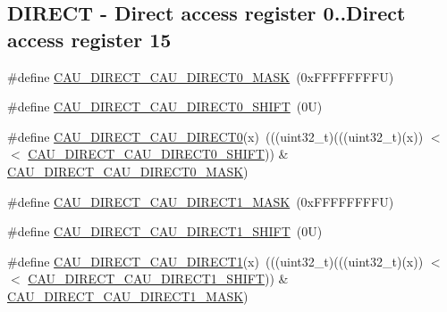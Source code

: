 \subsection*{D\+I\+R\+E\+CT -\/ Direct access register 0..Direct access register 15}
\begin{DoxyCompactItemize}
\item 
\#define \mbox{\hyperlink{group___c_a_u___register___masks_ga44f4bea009f3e9943e310dbbed98f7a3}{C\+A\+U\+\_\+\+D\+I\+R\+E\+C\+T\+\_\+\+C\+A\+U\+\_\+\+D\+I\+R\+E\+C\+T0\+\_\+\+M\+A\+SK}}~(0x\+F\+F\+F\+F\+F\+F\+F\+F\+U)
\item 
\#define \mbox{\hyperlink{group___c_a_u___register___masks_ga53178110db052d34395df9ad7e9afd0e}{C\+A\+U\+\_\+\+D\+I\+R\+E\+C\+T\+\_\+\+C\+A\+U\+\_\+\+D\+I\+R\+E\+C\+T0\+\_\+\+S\+H\+I\+FT}}~(0\+U)
\item 
\#define \mbox{\hyperlink{group___c_a_u___register___masks_ga2cb8f0d18407e272c7d87b9e747f278b}{C\+A\+U\+\_\+\+D\+I\+R\+E\+C\+T\+\_\+\+C\+A\+U\+\_\+\+D\+I\+R\+E\+C\+T0}}(x)~(((uint32\+\_\+t)(((uint32\+\_\+t)(x)) $<$$<$ \mbox{\hyperlink{group___c_a_u___register___masks_ga53178110db052d34395df9ad7e9afd0e}{C\+A\+U\+\_\+\+D\+I\+R\+E\+C\+T\+\_\+\+C\+A\+U\+\_\+\+D\+I\+R\+E\+C\+T0\+\_\+\+S\+H\+I\+FT}})) \& \mbox{\hyperlink{group___c_a_u___register___masks_ga44f4bea009f3e9943e310dbbed98f7a3}{C\+A\+U\+\_\+\+D\+I\+R\+E\+C\+T\+\_\+\+C\+A\+U\+\_\+\+D\+I\+R\+E\+C\+T0\+\_\+\+M\+A\+SK}})
\item 
\#define \mbox{\hyperlink{group___c_a_u___register___masks_ga201696a74ac7fd3db77cd19d3d2110cf}{C\+A\+U\+\_\+\+D\+I\+R\+E\+C\+T\+\_\+\+C\+A\+U\+\_\+\+D\+I\+R\+E\+C\+T1\+\_\+\+M\+A\+SK}}~(0x\+F\+F\+F\+F\+F\+F\+F\+F\+U)
\item 
\#define \mbox{\hyperlink{group___c_a_u___register___masks_ga99cc153a4a7217feeea9ccc898a38d98}{C\+A\+U\+\_\+\+D\+I\+R\+E\+C\+T\+\_\+\+C\+A\+U\+\_\+\+D\+I\+R\+E\+C\+T1\+\_\+\+S\+H\+I\+FT}}~(0\+U)
\item 
\#define \mbox{\hyperlink{group___c_a_u___register___masks_ga187f19ca2f30c2ec338747f4a83f97a4}{C\+A\+U\+\_\+\+D\+I\+R\+E\+C\+T\+\_\+\+C\+A\+U\+\_\+\+D\+I\+R\+E\+C\+T1}}(x)~(((uint32\+\_\+t)(((uint32\+\_\+t)(x)) $<$$<$ \mbox{\hyperlink{group___c_a_u___register___masks_ga99cc153a4a7217feeea9ccc898a38d98}{C\+A\+U\+\_\+\+D\+I\+R\+E\+C\+T\+\_\+\+C\+A\+U\+\_\+\+D\+I\+R\+E\+C\+T1\+\_\+\+S\+H\+I\+FT}})) \& \mbox{\hyperlink{group___c_a_u___register___masks_ga201696a74ac7fd3db77cd19d3d2110cf}{C\+A\+U\+\_\+\+D\+I\+R\+E\+C\+T\+\_\+\+C\+A\+U\+\_\+\+D\+I\+R\+E\+C\+T1\+\_\+\+M\+A\+SK}})
\item 

\end{DoxyCompactItemize}

